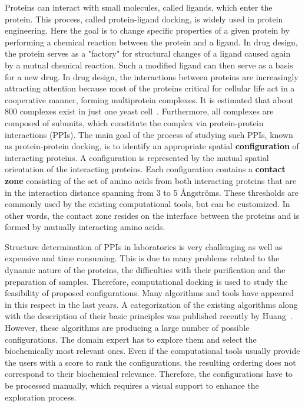 \documentclass{bmcart}
\begin{document}
Proteins can interact with small molecules, called ligands, which enter the protein.
This process, called protein-ligand docking, is widely used in protein engineering.
Here the goal is to change specific properties of a given protein by performing a chemical reaction between the protein and a ligand.
In drug design, the protein serves as a "factory" for structural changes of a ligand caused again by a mutual chemical reaction. 
Such a modified ligand can then serve as a basis for a new drug. 
In drug design, the interactions between proteins are increasingly attracting attention because most of the proteins critical for cellular life act in a cooperative manner, forming multiprotein complexes. 
It is estimated that about 800 complexes exist in just one yeast cell~\cite{Gavin}. 
Furthermore, all complexes are composed of subunits, which constitute the complex via protein-protein interactions (PPIs).
The main goal of the process of studying such PPIs, known as protein-protein docking, is to identify an appropriate spatial \textbf{configuration} of interacting proteins.
A configuration is represented by the mutual spatial orientation of the interacting proteins.
Each configuration contains a \textbf{contact zone} consisting of the set of amino acids from both interacting proteins that are in the interaction distance spanning from 3 to 5 \AA ngstr\"{o}ms.
These thresholds are commonly used by the existing computational tools, but can be customized.
In other words, the contact zone resides on the interface between the proteins and is formed by mutually interacting amino acids.

Structure determination of PPIs in laboratories is very challenging as well as expensive and time consuming.
This is due to many problems related to the dynamic nature of the proteins, the difficulties with their purification and the preparation of samples.
Therefore, computational docking is used to study the feasibility of proposed configurations.
Many algorithms and tools have appeared in this respect in the last years.
A categorization of the existing algorithms along with the description of their basic principles was published recently by Huang~\cite{Huang2014}.
However, these algorithms are producing a large number of possible configurations.
The domain expert has to explore them and select the biochemically most relevant ones. 
Even if the computational tools usually provide the users with a score to rank the configurations, the resulting ordering does not correspond to their biochemical relevance.
Therefore, the configurations have to be processed manually, which requires a visual support to enhance the exploration process.
\end{document}
